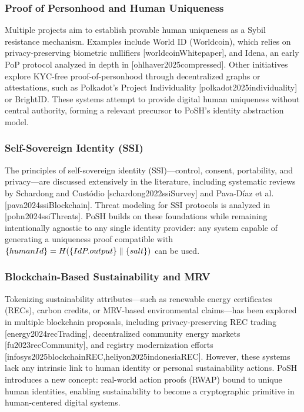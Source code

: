 \documentclass{article}
\begin{document}
\subsubsection{Proof of Personhood and Human Uniqueness}

Multiple projects aim to establish provable human uniqueness as a Sybil
resistance mechanism. Examples include World ID (Worldcoin), which relies on
privacy-preserving biometric nullifiers [worldcoinWhitepaper], and Idena,
an early PoP protocol analyzed in depth in [ohlhaver2025compressed]. Other
initiatives explore KYC-free proof-of-personhood through decentralized graphs
or attestations, such as Polkadot's Project Individuality
[polkadot2025individuality] or BrightID. These systems attempt to provide
digital human uniqueness without central authority, forming a relevant precursor
to PoSH's identity abstraction model.

\subsubsection{Self-Sovereign Identity (SSI)}

The principles of self-sovereign identity (SSI)---control, consent, portability,
and privacy---are discussed extensively in the literature, including systematic
reviews by Schardong and Custódio [schardong2022ssiSurvey] and Pava-Díaz
et al. [pava2024ssiBlockchain]. Threat modeling for SSI protocols is
analyzed in [pohn2024ssiThreats]. PoSH builds on these foundations while
remaining intentionally agnostic to any single identity provider: any system
capable of generating a uniqueness proof compatible with
$\mathsf\{humanId\} = H(\textsf\{IdP.output\} \parallel \textsf\{salt\})$ can be used.

\subsubsection{Blockchain-Based Sustainability and MRV}

Tokenizing sustainability attributes---such as renewable energy certificates
(RECs), carbon credits, or MRV-based environmental claims---has been explored in
multiple blockchain proposals, including privacy-preserving REC trading
[energy2024recTrading], decentralized community energy markets
[fu2023recCommunity], and registry modernization efforts
[infosys2025blockchainREC,heliyon2025indonesiaREC]. However, these systems
lack any intrinsic link to human identity or personal sustainability actions.
PoSH introduces a new concept: real-world action proofs (RWAP) bound to unique
human identities, enabling sustainability to become a cryptographic primitive
in human-centered digital systems.
\end{document}
